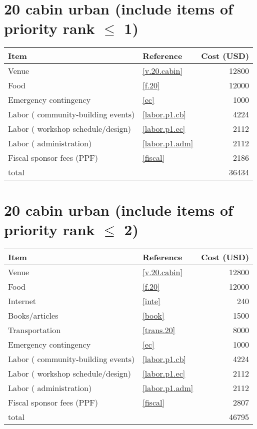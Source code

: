 \section*{20 cabin urban (include items of priority rank $\leq$ 1)}
\begin{center}
\begin{tabular}{llr}
Item & Reference & Cost (USD) \\ \hline
Venue & \ref{v.20.cabin} & 12800 \\
Food & \ref{f.20} & 12000 \\
Emergency contingency & \ref{ec} & 1000 \\
Labor ( community-building events) & \ref{labor.p1.cb} & 4224 \\
Labor ( workshop schedule/design) & \ref{labor.p1.ec} & 2112 \\
Labor ( administration) & \ref{labor.p1.adm} & 2112 \\
Fiscal sponsor fees (PPF) & \ref{fiscal} & 2186 \\ \hline
total &  & 36434
\end{tabular}
\end{center}
\newpage
\section*{20 cabin urban (include items of priority rank $\leq$ 2)}
\begin{center}
\begin{tabular}{llr}
Item & Reference & Cost (USD) \\ \hline
Venue & \ref{v.20.cabin} & 12800 \\
Food & \ref{f.20} & 12000 \\
Internet & \ref{inte} & 240 \\
Books/articles & \ref{book} & 1500 \\
Transportation & \ref{trans.20} & 8000 \\
Emergency contingency & \ref{ec} & 1000 \\
Labor ( community-building events) & \ref{labor.p1.cb} & 4224 \\
Labor ( workshop schedule/design) & \ref{labor.p1.ec} & 2112 \\
Labor ( administration) & \ref{labor.p1.adm} & 2112 \\
Fiscal sponsor fees (PPF) & \ref{fiscal} & 2807 \\ \hline
total &  & 46795
\end{tabular}
\end{center}
\newpage
